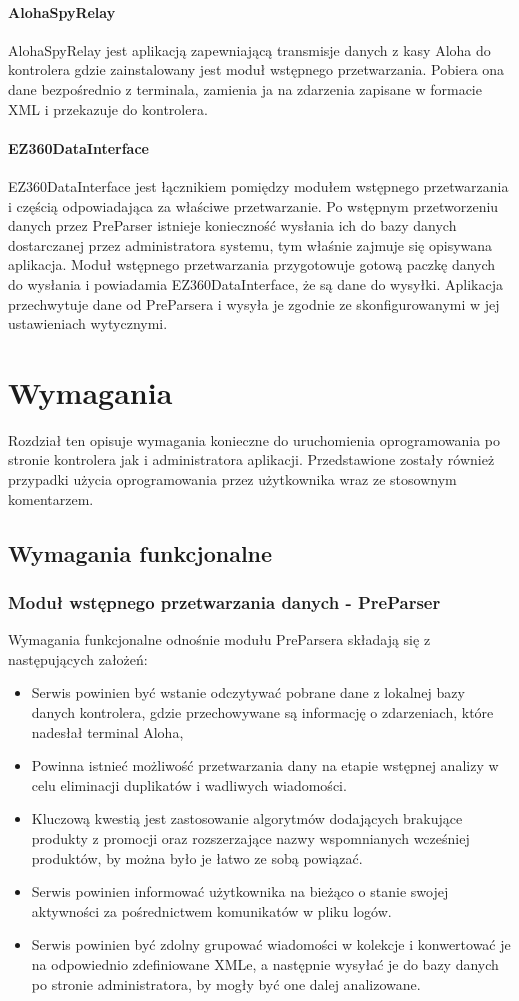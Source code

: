 \documentclass[a4paper]{book}
\begin{document}
\subsubsection{AlohaSpyRelay}
AlohaSpyRelay jest aplikacją zapewniającą transmisje danych z kasy Aloha do kontrolera gdzie zainstalowany jest moduł wstępnego przetwarzania. Pobiera ona dane bezpośrednio z terminala, zamienia ja na zdarzenia zapisane w formacie XML i przekazuje do kontrolera.
\subsubsection{EZ360DataInterface}
EZ360DataInterface jest łącznikiem pomiędzy modułem wstępnego przetwarzania i częścią odpowiadająca za właściwe przetwarzanie. Po wstępnym przetworzeniu danych przez PreParser istnieje konieczność wysłania ich do bazy danych dostarczanej przez administratora systemu, tym właśnie zajmuje się opisywana aplikacja. Moduł wstępnego przetwarzania przygotowuje gotową paczkę danych do wysłania i powiadamia EZ360DataInterface, że są dane do wysyłki. Aplikacja przechwytuje dane od PreParsera i wysyła je zgodnie ze skonfigurowanymi w jej ustawieniach wytycznymi.
\chapter{Wymagania}
\label{rozdzial3}
Rozdział ten opisuje wymagania konieczne do uruchomienia oprogramowania po stronie kontrolera jak i administratora aplikacji. Przedstawione zostały również przypadki użycia oprogramowania przez użytkownika wraz ze stosownym komentarzem.
\section{Wymagania funkcjonalne}
\subsection{Moduł wstępnego przetwarzania danych - PreParser}
Wymagania funkcjonalne odnośnie modułu PreParsera składają się z następujących założeń:
\begin{itemize}
	\item Serwis powinien być wstanie odczytywać pobrane dane z lokalnej bazy danych kontrolera, gdzie przechowywane są informację o zdarzeniach, które nadesłał terminal Aloha,
	\item Powinna istnieć możliwość przetwarzania dany na etapie wstępnej analizy w celu eliminacji duplikatów i wadliwych wiadomości.
	\item Kluczową kwestią jest zastosowanie algorytmów dodających brakujące produkty z promocji oraz rozszerzające nazwy wspomnianych wcześniej produktów, by można było je łatwo ze sobą powiązać.
	\item Serwis powinien informować użytkownika na bieżąco o stanie swojej aktywności za pośrednictwem komunikatów w pliku logów.
	\item Serwis powinien być zdolny grupować wiadomości w kolekcje i konwertować je na odpowiednio zdefiniowane XMLe, a następnie wysyłać je do bazy danych po stronie administratora, by mogły być one dalej analizowane.
\end{itemize}
\end{document}
